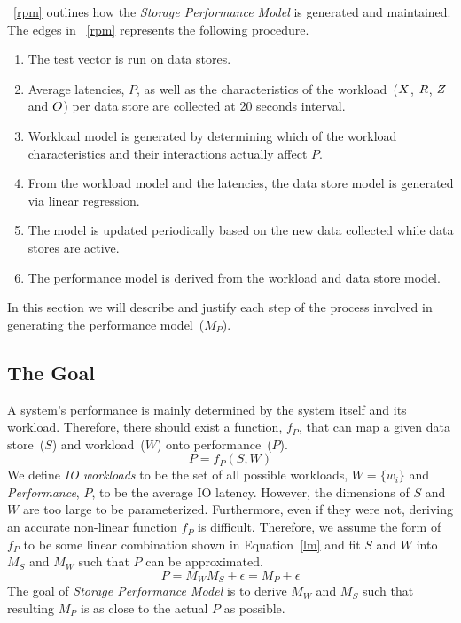 \figurename~\ref{rpm} outlines how the \emph{Storage Performance Model} is generated and maintained.
The edges in \figurename~\ref{rpm} represents the following procedure.\
\begin{enumerate}
\item The test vector is run on data stores.
\item Average latencies, $P$, as well as the characteristics of the workload~($X$, $R$, $Z$ and $O$) per data store are collected at 20 seconds interval.
\item Workload model is generated by determining which of the workload characteristics and their interactions actually affect $P$.
\item From the workload model and the latencies, the data store model is generated via linear regression.
\item The model is updated periodically based on the new data collected while data stores are active.
\item The performance model is derived from the workload and data store model.
\end{enumerate}
In this section we will describe and justify each step of the process involved in generating the performance model~($M_P$).

\subsection{The Goal}
A system's performance is mainly determined by the system itself and its workload.
Therefore, there should exist a function, $f_P$, that can map a given data store~($S$) and workload~($W$) onto performance~($P$).
\begin{equation}
P=f_P(S, W)\label{psw}
\end{equation}
We define \emph{IO workloads} to be the set of all possible workloads, $W=\{w_i\}$ and \emph{Performance}, $P$, to be the average IO latency.
However, the dimensions of $S$ and $W$ are too large to be parameterized. Furthermore, even if they were not, deriving an accurate non-linear function $f_P$ is difficult.
Therefore, we assume the form of $f_P$ to be some linear combination shown in Equation~\ref{lm} and fit $S$ and $W$ into $M_S$ and $M_W$ such that $P$ can be approximated.
\begin{equation} \label{rlm}
P = M_W M_S+\epsilon = M_P+\epsilon
\end{equation}
The goal of \emph{Storage Performance Model} is to derive $M_W$ and $M_S$ such that resulting $M_P$ is as close to the actual $P$ as possible.

